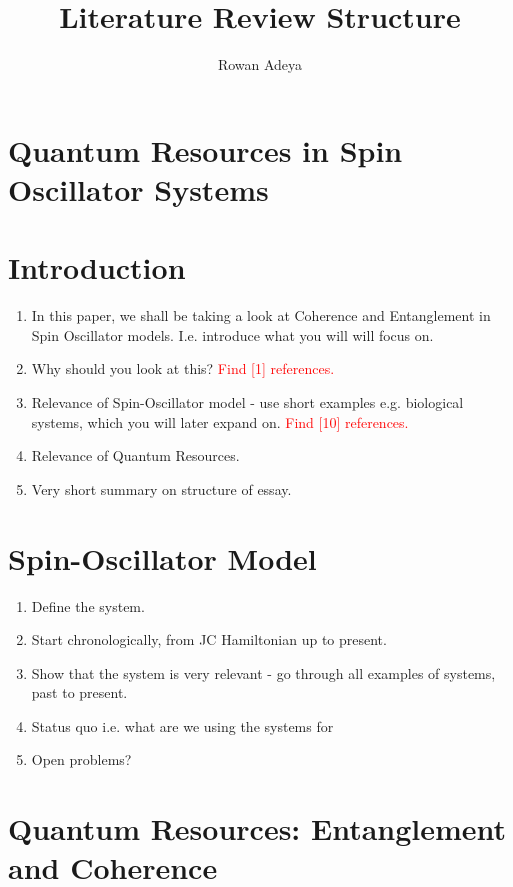 \documentclass{article}
\title{Literature Review Structure}
\author{Rowan Adeya}
\date{ }
\begin{document}
\maketitle

\tableofcontents

\newpage

\section{Quantum Resources in Spin Oscillator Systems}

\section{Introduction}

\begin{enumerate}
    \item In this paper, we shall be taking a look at Coherence and Entanglement in Spin Oscillator models. I.e. introduce what you will will focus on.
    \item Why should you look at this? \textcolor{red}{Find [1] references.}
    \item Relevance of Spin-Oscillator model - use short examples e.g. biological systems, which you will later expand on. \textcolor{red}{Find [10] references.}
    \item Relevance of Quantum Resources.
    \item Very short summary on structure of essay. 
\end{enumerate}


\section{Spin-Oscillator Model}
\begin{enumerate}
    \item Define the system.
    \item Start chronologically, from JC Hamiltonian up to present. 
    \item Show that the system is very relevant - go through all examples of systems, past to present.
    \item Status quo i.e. what are we using the systems for
    \item Open problems?
\end{enumerate}

\section{Quantum Resources: Entanglement and Coherence}
\end{document}
